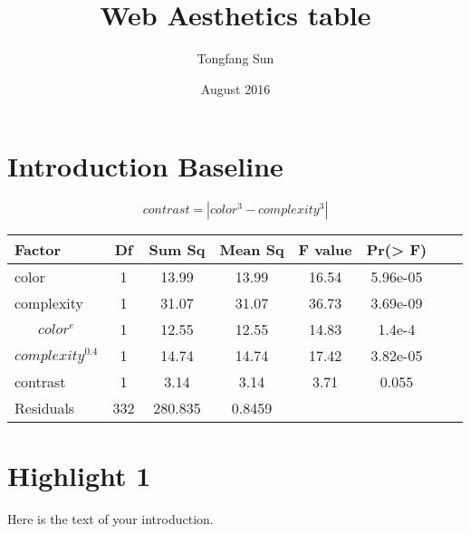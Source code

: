 \documentclass{article}
\title{Web Aesthetics table}
\author{Tongfang Sun}
\date{August 2016}
\begin{document}
\maketitle

\section{Introduction Baseline}


$$contrast = |color^3 - complexity^3| $$



\begin{tabular}{l*{6}{c}r}
Factor              & Df & Sum Sq & Mean Sq & F value & Pr(> F) \\
\hline
color             & 1 & 13.99 & 13.99 & 16.54 & 5.96e-05   \\
complexity           & 1 & 31.07 & 31.07 & 36.73 &  3.69e-09  \\
$$color^{e}$$         & 1 & 12.55 & 12.55 & 14.83 &  1.4e-4  \\
$$complexity^{0.4}$$     & 1 & 14.74 & 14.74 & 17.42 &  3.82e-05  \\
contrast    & 1 & 3.14 & 3.14 & 3.71 &  0.055  \\
Residuals    & 332 & 280.835 & 0.8459 &  &    \\
\end{tabular}


\section{Highlight 1}
Here is the text of your introduction.
\end{document}

